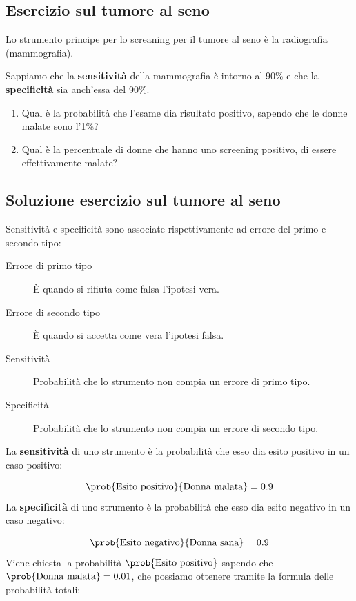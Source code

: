 \documentclass[\main/main.tex]{subfiles}
\begin{document}
\subsection{Esercizio sul tumore al seno}
Lo strumento principe per lo screaning per il tumore al seno è la radiografia (mammografia).

Sappiamo che la \textbf{sensitività} della mammografia è intorno al 90\% e che la \textbf{specificità} sia anch'essa del 90\%.

\begin{enumerate}
  \item Qual è la probabilità che l'esame dia risultato positivo, sapendo che le donne malate sono l'1\%?
  \item Qual è la percentuale di donne che hanno uno screening positivo, di essere effettivamente malate?
\end{enumerate}

\subsection{Soluzione esercizio sul tumore al seno}
Sensitività e specificità sono associate rispettivamente ad errore del primo e secondo tipo:

\begin{description}
  \item[Errore di primo tipo] È quando si rifiuta come falsa l'ipotesi vera.
  \item[Errore di secondo tipo] È quando si accetta come vera l'ipotesi falsa.
\end{description}

\begin{description}
  \item[Sensitività] Probabilità che lo strumento non compia un errore di primo tipo.
  \item[Specificità] Probabilità che lo strumento non compia un errore di secondo tipo.
\end{description}


La \textbf{sensitività} di uno strumento è la probabilità che esso dia esito positivo in un caso positivo:

\[
  \prob{\text{Esito positivo}}{\text{Donna malata}} = 0.9
\]
La \textbf{specificità} di uno strumento è la probabilità che esso dia esito negativo in un caso negativo:

\[
  \prob{\text{Esito negativo}}{\text{Donna sana}} = 0.9
\]
Viene chiesta la probabilità $\prob{\text{Esito positivo}}$ sapendo che $\prob{\text{Donna malata}}=0.01$, che possiamo ottenere tramite la formula delle probabilità totali:
\end{document}
